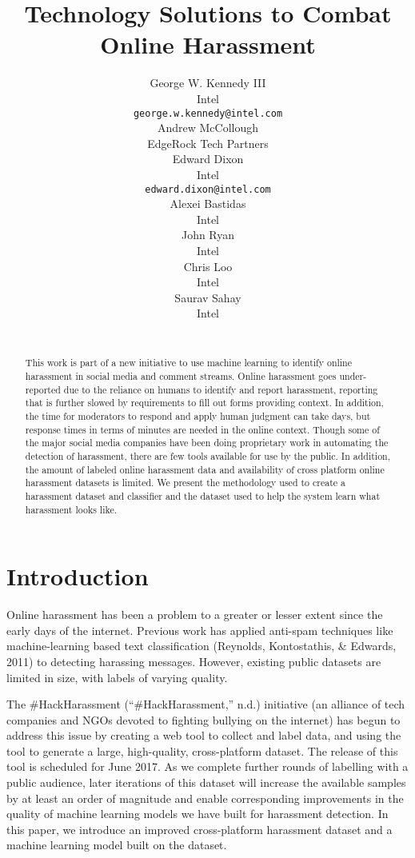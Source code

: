 \documentclass[11pt,a4paper]{article}
\title{Technology Solutions to Combat Online Harassment}
\author{George W. Kennedy III \\
  Intel \\
  {\tt george.w.kennedy@intel.com} \\
  \And
  Andrew McCollough \\
  EdgeRock Tech Partners \\
  \And
  Edward Dixon \\
  Intel\\
 {\tt edward.dixon@intel.com} \\
  \And
  Alexei Bastidas \\
  Intel \\
  \And
  John Ryan \\
  Intel \\
  \And
  Chris Loo \\
  Intel \\
  \And
  Saurav Sahay \\
  Intel \\\
}
\date{}
\begin{document}
\maketitle
\begin{abstract}
  This work is part of a new initiative to use machine
  learning to identify online harassment in social media
  and comment streams. Online harassment goes
  under-reported due to the reliance on humans to
  identify and report harassment, reporting that is further
  slowed by requirements to fill out forms
  providing context. In addition, the time for moderators
  to respond and apply human judgment can
  take days, but response times in terms of minutes
  are needed in the online context. Though some of
  the major social media companies have been doing
  proprietary work in automating the detection of
  harassment, there are few tools available for use by
  the public. In addition, the amount of labeled online
  harassment data and availability of cross platform
  online harassment datasets is limited. We present
  the methodology used to create a harassment dataset
  and classifier and the dataset used to help the
  system learn what harassment looks like.

\end{abstract}

\section{Introduction}

Online harassment has been a problem to a greater
or lesser extent since the early days of the internet.
Previous work has applied anti-spam techniques
like machine-learning based text classification
(Reynolds, Kontostathis, \& Edwards, 2011) to
detecting harassing messages. However, existing
public datasets are limited in size, with labels of
varying quality.

The \#HackHarassment (“\#HackHarassment,”
n.d.) initiative (an alliance of tech companies and
NGOs devoted to fighting bullying on the internet)
has begun to address this issue by creating a web
tool to collect and label data, and using the tool to
generate a large, high-quality, cross-platform dataset.
The release of this tool is scheduled for June
2017. As we complete further rounds of labelling
with a public audience, later iterations of this dataset
will increase the available samples by at least
an order of magnitude and enable corresponding
improvements in the quality of machine learning
models we have built for harassment detection. In
this paper, we introduce an improved cross-platform
harassment dataset and a machine learning
model built on the dataset.
\end{document}
